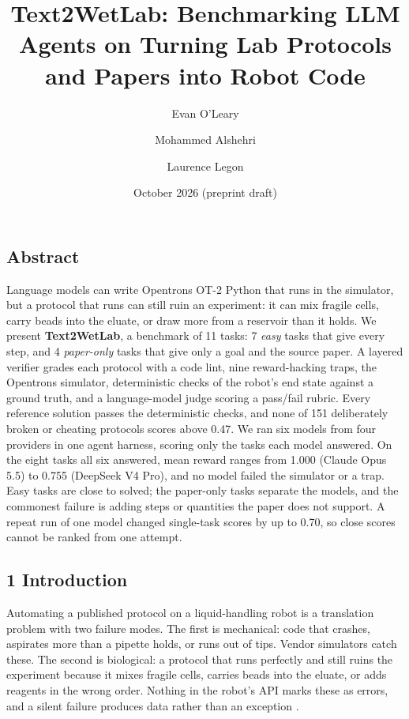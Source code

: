 \documentclass[
]{article}
\title{Text2WetLab: Benchmarking LLM Agents on Turning Lab Protocols and
Papers into Robot Code}
\author{Evan O'Leary \and Mohammed Alshehri \and Laurence Legon}
\date{October 2026 (preprint draft)}
\newcounter{none} %
\begin{document}
\maketitle

\subsection{Abstract}\label{abstract}

Language models can write Opentrons OT-2 Python that runs in the
simulator, but a protocol that runs can still ruin an experiment: it can
mix fragile cells, carry beads into the eluate, or draw more from a
reservoir than it holds. We present \textbf{Text2WetLab}, a benchmark of
11 tasks: 7 \emph{easy} tasks that give every step, and 4
\emph{paper-only} tasks that give only a goal and the source paper. A
layered verifier grades each protocol with a code lint, nine
reward-hacking traps, the Opentrons simulator, deterministic checks of
the robot's end state against a ground truth, and a language-model judge
scoring a pass/fail rubric. Every reference solution passes the
deterministic checks, and none of 151 deliberately broken or cheating
protocols scores above 0.47. We ran six models from four providers in
one agent harness, scoring only the tasks each model answered. On the
eight tasks all six answered, mean reward ranges from 1.000 (Claude Opus
5.5) to 0.755 (DeepSeek V4 Pro), and no model failed the simulator or a
trap. Easy tasks are close to solved; the paper-only tasks separate the
models, and the commonest failure is adding steps or quantities the
paper does not support. A repeat run of one model changed single-task
scores by up to 0.70, so close scores cannot be ranked from one attempt.

\subsection{1 Introduction}\label{introduction}

Automating a published protocol on a liquid-handling robot is a
translation problem with two failure modes. The first is mechanical:
code that crashes, aspirates more than a pipette holds, or runs out of
tips. Vendor simulators catch these. The second is biological: a
protocol that runs perfectly and still ruins the experiment because it
mixes fragile cells, carries beads into the eluate, or adds reagents in
the wrong order. Nothing in the robot's API marks these as errors, and a
silent failure produces data rather than an exception
\citep{setty2026aegis}.
\end{document}
